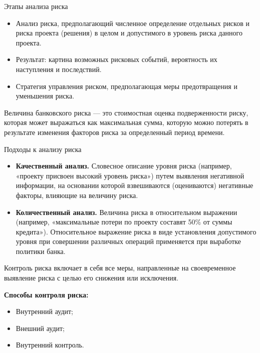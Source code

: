 \documentclass[financial_risks_lectures.tex]{subfiles}
\begin{document}
\begin{frame}[shrink=10]{Этапы анализа риска}
\begin{itemize}
\item
Анализ риска, предполагающий численное определение отдельных рисков и риска проекта (решения) в целом и  допустимого в уровень риска данного проекта.
\item
Результат: картина возможных рисковых событий, вероятность их наступления и последствий. 
\item
Стратегия управления риском, предполагающая меры предотвращения и уменьшения риска.
\end{itemize}
\begin{block}{Величина банковского риска }
\quad — это стоимостная оценка подверженности риску, которая может выражаться как максимальная сумма, которую можно потерять в результате изменения факторов риска за определенный период времени.
\end{block}
\end{frame}

\begin{frame}{Подходы к анализу риска}
\begin{itemize}[<+->]
\item
\textbf{Качественный анализ. }Словесное описание уровня риска (например, «проекту присвоен высокий уровень риска») путем выявления негативной информации, на основании которой взвешиваются (оцениваются) негативные факторы, влияющие на величину риска.
\item
\textbf{Количественный анализ.} Величина риска в относительном выражении (например, «максимальные потери по проекту составят 50\% от суммы кредита»). Относительное выражение риска в виде установления допустимого уровня при совершении различных операций применяется при выработке политики банка.
\end{itemize}
\end{frame}

\begin{frame}{Контроль риска }
\quad включает в себя все меры, направленные на своевременное выявление риска с целью его снижения или исключения. 

\textbf{Способы контроля риска:}

\begin{itemize}[<+->]
\item
Внутренний аудит;
\item
Внешний аудит;
\item
Внутренний контроль.
\end{itemize}
\end{frame}
\end{document}
